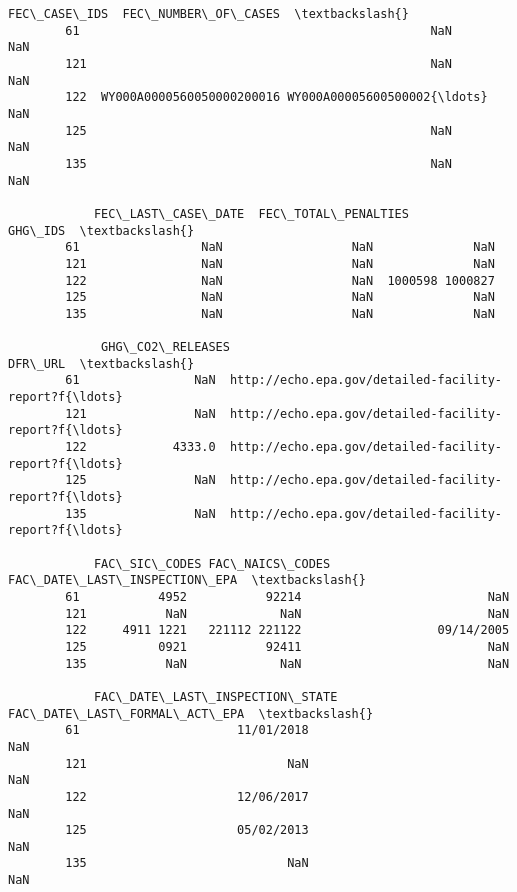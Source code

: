 \documentclass[11pt]{article}
\begin{document}
\begin{Verbatim}[commandchars=\\\{\}]
                                                  FEC\_CASE\_IDS  FEC\_NUMBER\_OF\_CASES  \textbackslash{}
        61                                                 NaN                  NaN   
        121                                                NaN                  NaN   
        122  WY000A0000560050000200016 WY000A00005600500002{\ldots}                  NaN   
        125                                                NaN                  NaN   
        135                                                NaN                  NaN   
        
            FEC\_LAST\_CASE\_DATE  FEC\_TOTAL\_PENALTIES          GHG\_IDS  \textbackslash{}
        61                 NaN                  NaN              NaN   
        121                NaN                  NaN              NaN   
        122                NaN                  NaN  1000598 1000827   
        125                NaN                  NaN              NaN   
        135                NaN                  NaN              NaN   
        
             GHG\_CO2\_RELEASES                                            DFR\_URL  \textbackslash{}
        61                NaN  http://echo.epa.gov/detailed-facility-report?f{\ldots}   
        121               NaN  http://echo.epa.gov/detailed-facility-report?f{\ldots}   
        122            4333.0  http://echo.epa.gov/detailed-facility-report?f{\ldots}   
        125               NaN  http://echo.epa.gov/detailed-facility-report?f{\ldots}   
        135               NaN  http://echo.epa.gov/detailed-facility-report?f{\ldots}   
        
            FAC\_SIC\_CODES FAC\_NAICS\_CODES FAC\_DATE\_LAST\_INSPECTION\_EPA  \textbackslash{}
        61           4952           92214                          NaN   
        121           NaN             NaN                          NaN   
        122     4911 1221   221112 221122                   09/14/2005   
        125          0921           92411                          NaN   
        135           NaN             NaN                          NaN   
        
            FAC\_DATE\_LAST\_INSPECTION\_STATE FAC\_DATE\_LAST\_FORMAL\_ACT\_EPA  \textbackslash{}
        61                      11/01/2018                          NaN   
        121                            NaN                          NaN   
        122                     12/06/2017                          NaN   
        125                     05/02/2013                          NaN   
        135                            NaN                          NaN   
        

\end{Verbatim}
\end{document}
